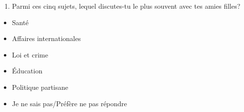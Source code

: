 \documentclass[
  letterpaper,
  DIV=11,
  numbers=noendperiod]{scrreprt}
\providecommand{\tightlist}{%
  \setlength{\itemsep}{0pt}\setlength{\parskip}{0pt}}\usepackage{longtable,booktabs,array}
\begin{document}
\begin{enumerate}
\def\labelenumi{\arabic{enumi}.}
\setcounter{enumi}{11}
\tightlist
\item
  Parmi ces cinq sujets, lequel discutes-tu le plus souvent avec tes
  amies filles?
\end{enumerate}

\begin{itemize}
\tightlist
\item
  Santé
\item
  Affaires internationales
\item
  Loi et crime
\item
  Éducation
\item
  Politique partisane
\item
  Je ne sais pas/Préfère ne pas répondre
\end{itemize}
\end{document}
